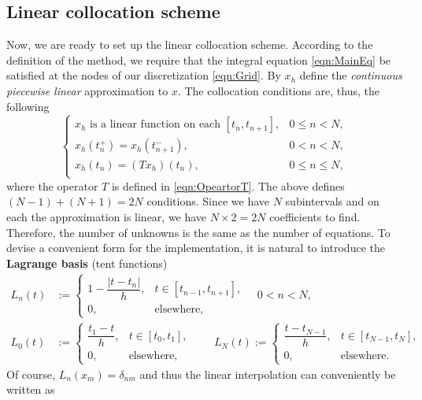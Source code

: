 \documentclass[12pt,a4paper]{article}
\begin{document}
\subsection{Linear collocation scheme}
Now, we are ready to set up the linear collocation scheme. According to the definition of the method, we require that the integral equation \eqref{eqn:MainEq} be satisfied at the nodes of our discretization \eqref{eqn:Grid}. By $x_h$ define the \emph{continuous piecewise linear} approximation to $x$. The collocation conditions are, thus, the following
\begin{equation}\label{eqn:LinearCollocationScheme}
	\begin{cases}
		x_h \text{ is a linear function on each } [t_n, t_{n+1}], & 0 \leq n < N, \\
		x_h(t_n^+) = x_h(t_{n+1}^-), & 0 < n < N, \\
		x_h(t_n) = (Tx_h)(t_n), & 0 \leq n \leq N, \\
	\end{cases}
\end{equation}
where the operator $T$ is defined in \eqref{eqn:OpeartorT}. The above defines $(N-1) + (N + 1) = 2N$ conditions. Since we have $N$ subintervals and on each the approximation is linear, we have $N \times 2 = 2N$ coefficients to find. Therefore, the number of unknowns is the same as the number of equations. To devise a convenient form for the implementation, it is natural to introduce the \textbf{Lagrange basis} (tent functions)
\begin{equation}
	\begin{split}
		L_n(t) &:= 
		\begin{cases} 
			1-\dfrac{|t-t_n|}{h}, & t \in [t_{n-1}, t_{n+1}], \\
			0, & \text{elsewhere},
		\end{cases}
		\quad 0 < n < N, \\
		L_0(t) &:= \begin{cases} 
			\dfrac{t_1-t}{h}, & t \in [t_0, t_1], \\
			0, & \text{elsewhere},
		\end{cases}
		\quad
		\quad L_N(t) := \begin{cases} 
			\dfrac{t-t_{N-1}}{h}, & t \in [t_{N-1}, t_{N}], \\
			0, & \text{elsewhere}.
		\end{cases}
	\end{split}
\end{equation}
Of course, $L_n(x_m) = \delta_{nm}$ and thus the linear interpolation can conveniently be written as
\end{document}
